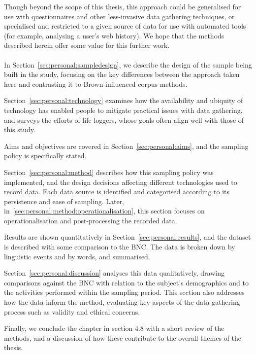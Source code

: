 Though beyond the scope of this thesis, this approach could be generalised for use with questionnaires and other less-invasive data gathering techniques, or specialised and restricted to a given source of data for use with automated tools (for example, analysing a user's web history).  We hope that the methods described herein offer some value for this further work.


\paragraph{}
In Section~\ref{sec:personal:sampledesign}, we describe the design of the sample being built in the study, focusing on the key differences between the approach taken here and contrasting it to Brown-influenced corpus methods.

Section~\ref{sec:personal:technology} examines how the availability and ubiquity of technology has enabled people to mitigate practical issues with data gathering, and surveys the efforts of life loggers, whose goals often align well with those of this study.

Aims and objectives are covered in Section~\ref{sec:personal:aims}, and the sampling policy is specifically stated.

Section~\ref{sec:personal:method} describes how this sampling policy was implemented, and the design decisions affecting different technologies used to record data.  Each data source is identified and categorised according to its persistence and ease of sampling.  Later, in~\ref{sec:personal:method:operationalisation}, this section focuses on operationalisation and post-processing the recorded data.

Results are shown quantitatively in Section~\ref{sec:personal:results}, and the dataset is described with some comparison to the BNC\@.  The data is broken down by linguistic events and by words, and summarised.

Section~\ref{sec:personal:discussion} analyses this data qualitatively, drawing comparisons against the BNC with relation to the subject's demographics and to the activities performed within the sampling period.  This section also addresses how the data inform the method, evaluating key aspects of the data gathering process such as validity and ethical concerns.

Finally, we conclude the chapter in section 4.8 with a short review of the methods, and a discussion of how these contribute to the overall themes of the thesis.

